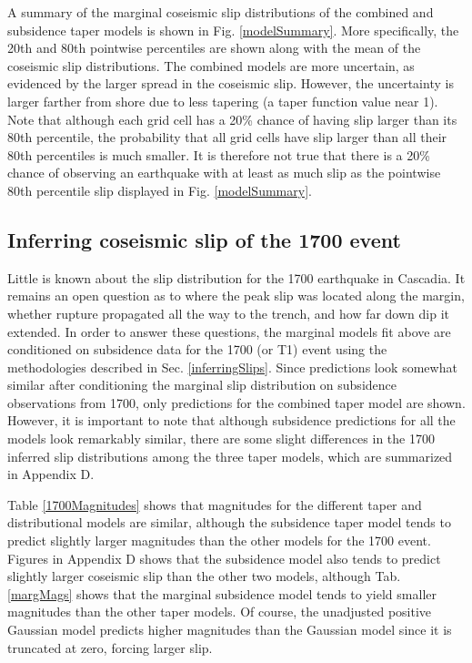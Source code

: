 {A summary of the marginal coseismic slip distributions of the combined and subsidence taper models is shown in Fig. \ref{modelSummary}.  More specifically, the 20th and 80th pointwise percentiles are shown along with the mean of the coseismic slip distributions.  The combined models are more uncertain, as evidenced by the larger spread in the coseismic slip.  However, the uncertainty is larger farther from shore due to less tapering (a taper function value near 1).  Note that although each grid cell has a 20\% chance of having slip larger than its 80th percentile, the probability that all grid cells have slip larger than all their 80th percentiles is much smaller.  It is therefore not true that there is a 20\% chance of observing an earthquake with at least as much slip as the pointwise 80th percentile slip displayed in Fig. \ref{modelSummary}.

\FloatBarrier
\subsection{Inferring coseismic slip of the 1700 event}
\label{1700}
Little is known about the slip distribution for the 1700 earthquake in Cascadia.  It remains an open question as to where the peak slip was located along the margin, whether rupture propagated all the way to the trench, and how far down dip it extended. In order to answer these questions, the marginal models fit above are conditioned on subsidence data for the 1700 (or T1) event using the methodologies described in Sec. \ref{inferringSlips}.  Since predictions look somewhat similar after conditioning the marginal slip distribution on subsidence observations from 1700, only predictions for the combined taper model are shown.  However, it is important to note that although subsidence predictions for all the models look remarkably similar, there are some slight differences in the 1700 inferred slip distributions among the three taper models, which are summarized in Appendix D.

Table \ref{1700Magnitudes} shows that magnitudes for the different taper and distributional models are similar, although the subsidence taper model tends to predict slightly larger magnitudes than the other models for the 1700 event.  Figures in Appendix D shows that the subsidence model also tends to predict slightly larger coseismic slip than the other two models, although Tab. \ref{margMags} shows that the marginal subsidence model tends to yield smaller magnitudes than the other taper models.  Of course, the unadjusted positive Gaussian model predicts higher magnitudes than the Gaussian model since it is truncated at zero, forcing larger slip.

}
